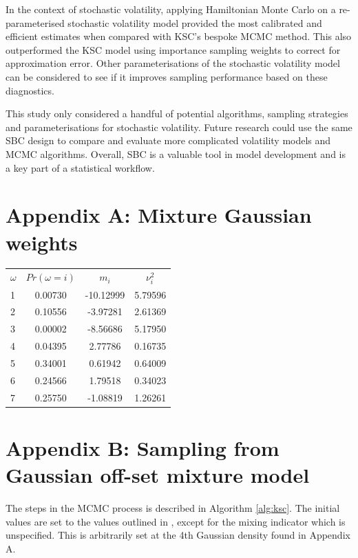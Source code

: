\documentclass[12pt, a4paper]{article}
\begin{document}
In the context of stochastic volatility, applying Hamiltonian Monte Carlo on a re-parameterised stochastic volatility model provided the most calibrated and efficient estimates when compared with KSC's bespoke MCMC method. This also outperformed the KSC model using importance sampling weights to correct for approximation error. Other parameterisations of the stochastic volatility model can be considered to see if it improves sampling performance based on these diagnostics. 

This study only considered a handful of potential algorithms, sampling strategies and parameterisations for stochastic volatility. Future research could use the same SBC design to compare and evaluate more complicated volatility models and MCMC algorithms. Overall, SBC is a valuable tool in model development and is a key part of a statistical workflow. 
 
\newpage



\newpage

\section{Appendix A: Mixture Gaussian weights}

\begin{table}[H]
    \centering
    \begin{tabular}{lccc} 
          $\omega$ &$Pr(\omega = i)$&  $m_i$&  $\nu^2_i$\\ 
          1&0.00730  &  -10.12999&  5.79596\\ 
          2&0.10556  &   -3.97281 &  2.61369\\ 
          3&0.00002 &  -8.56686 &   5.17950\\ 
          4&0.04395 &  2.77786  &   0.16735 \\ 
          5&0.34001&   0.61942    &  0.64009\\ 
          6&0.24566 &  1.79518    &  0.34023 \\ 
          7&0.25750 &  -1.08819    &  1.26261\\ 
    \end{tabular} 
\end{table}

\newpage

\section{Appendix B: Sampling from Gaussian off-set mixture model}
    The steps in the MCMC process is described in Algorithm \ref{alg:ksc}. The initial values are set to the values outlined in \citet{kim1998stochastic}, except for the mixing indicator which is unspecified. This is arbitrarily set at the 4th Gaussian density found in Appendix A. 
        
\end{document}
